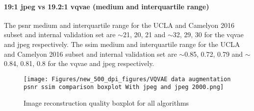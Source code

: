 \documentclass[review]{elsarticle}
\begin{document}


\paragraph{19:1 \gls{jpeg} vs 19.2:1 \gls{vqvae} (medium and interquartile range)} The \gls{psnr} medium and interquartile range for the UCLA and Camelyon 2016 subset and internal validation set are $\sim$21, 20, 21 and $\sim$32, 29, 30 for the \gls{vqvae} and \gls{jpeg} respectively.
The \gls{ssim} medium and interquartile range for the UCLA and Camelyon 2016 subset and internal validation set are $\sim$0.85, 0.72, 0.79 and $\sim$0.84, 0.81, 0.8 for the \gls{vqvae} and \gls{jpeg} respectively.

\begin{figure}
\texttt{[image: Figures/new\_500\_dpi\_figures/VQVAE data augmentation psnr ssim comparison boxplot With jpeg and jpeg 2000.png]}
\caption{Image reconstruction quality boxplot for all algorithms}
\label{fig:image_reconstruction_quality_boxplot_for_all_algorithms}
\end{figure}
\end{document}
